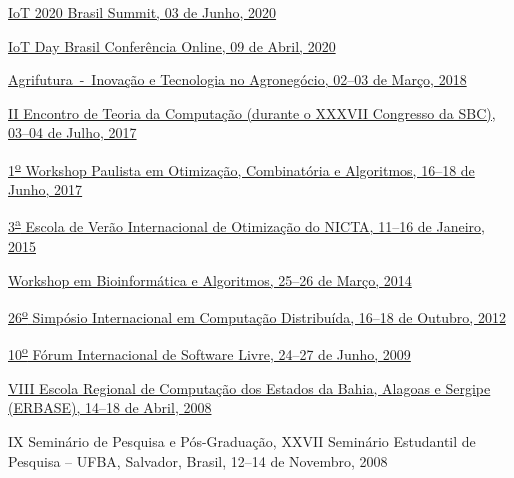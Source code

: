 \documentclass[10pt]{article}
\begin{document}
\begin{innerlist}
\item \href{https://telecomwebinar.com/iot-brasil-summit-2020/}{IoT 2020 Brasil Summit, 03 de Junho, 2020}
  
\item \href{https://iotday.org/2020/iot-day-brasil-online-conference}{IoT Day Brasil Conferência Online, 09 de Abril, 2020}
  
    \item \hypertarget{evento:agrifutura2018}{\href{https://www.hackathon.com/event/agrifutura-2018---inovacao-e-tecnologia-no-agronegocio-42435741445}{Agrifutura~-~Inovação e Tecnologia no Agronegócio, 02--03 de Março, 2018}}
      
    \item \href{http://csbc2017.mackenzie.br/eventos/2-etc}{II Encontro de Teoria da Computação (durante o XXXVII Congresso da SBC), 03--04 de Julho, 2017}
  
    \item \href{https://www.ic.unicamp.br/~ra134042/wopoca2017/}{1\textsuperscript{\underline{o}} Workshop Paulista em Otimização, Combinatória e Algoritmos, 16--18 de Junho, 2017}
  
    \item \href{http://org.nicta.com.au/study-with-us/nicta-optimisation-summer-school-2015/}{3\textsuperscript{\underline{a}} Escola de Verão Internacional de Otimização do NICTA, 11--16 de Janeiro, 2015}

	\item \href{http://www.ime.usp.br/~afreire/WBA2014.html}{Workshop em Bioinformática e Algoritmos, 25--26 de Março, 2014}

    \item \href{http://www.lasid.ufba.br/disc2012/view/index.php}{26\textsuperscript{\underline{o}} Simpósio Internacional em Computação Distribuída, 16--18 de Outubro, 2012}

    \item \href{http://softwarelivre.org/fisl}{10\textsuperscript{\underline{o}} Fórum Internacional de Software Livre, 24--27 de Junho, 2009}
    
    \item \href{http://www.erbase2008.ufba.br}{VIII Escola Regional de Computação dos Estados da Bahia, Alagoas e Sergipe (ERBASE), 14--18 de Abril, 2008}

    \item IX Seminário de Pesquisa e Pós-Graduação, XXVII Seminário Estudantil de Pesquisa -- UFBA, Salvador, Brasil, 12--14 de Novembro, 2008


\end{innerlist}
\end{document}

